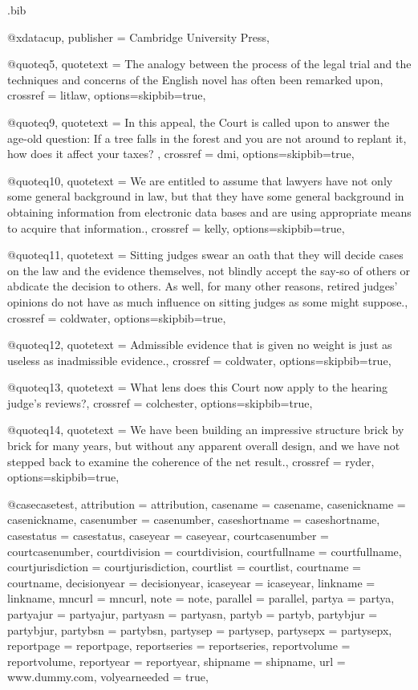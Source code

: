 \begin{filecontents*}[overwrite]{\jobname.bib}


@xdata{cup,	publisher =  {Cambridge University Press},												}

@quote{q5,	quotetext =  {The analogy between the process of the legal trial and the techniques and concerns of the English novel has often been remarked upon},	crossref =  {litlaw},				options={skipbib=true},}

@quote{q9,	quotetext =  { In this appeal, the Court is called upon to answer the age-old question:  If a tree falls in the forest and you are not around to replant it, how does it affect your taxes? },	crossref =  {dmi},				options={skipbib=true},}

@quote{q10,	quotetext =  {We are entitled to assume that lawyers have not only some general background in law, but that they have some general background in obtaining information from electronic data bases and are using appropriate means to acquire that information.},	crossref =  {kelly},				options={skipbib=true},}

@quote{q11,	quotetext =  {Sitting judges swear an oath that they will decide cases on the law and the evidence themselves, not blindly accept the say-so of others or abdicate the decision to others. As well, for many other reasons, retired judges’ opinions do not have as much influence on sitting judges as some might suppose.},	crossref =  {coldwater},				options={skipbib=true},}

@quote{q12,	quotetext =  {Admissible evidence that is given no weight is just as useless as inadmissible evidence.},	crossref =  {coldwater},				options={skipbib=true},}

@quote{q13,	quotetext =  {What lens does this Court now apply to the hearing judge’s reviews?},	crossref =  {colchester},				options={skipbib=true},}

@quote{q14,	quotetext =  {We have been building an impressive structure brick by brick for many years, but without any apparent overall design, and we have not stepped back to examine the coherence of the net result.},	crossref =  {ryder},				options={skipbib=true},}


@case{casetest,
attribution = {attribution},
casename = {casename},
casenickname = {casenickname},
casenumber = {casenumber},
caseshortname = {caseshortname},
casestatus = {casestatus},
caseyear = {caseyear},
courtcasenumber = {courtcasenumber},
courtdivision = {courtdivision},
courtfullname = {courtfullname},
courtjurisdiction = {courtjurisdiction},
courtlist = {courtlist},
courtname = {courtname},
decisionyear = {decisionyear},
icaseyear = {icaseyear},
linkname = {linkname},
mncurl = {mncurl},
note = {note},
parallel = {parallel},
partya = {partya},
partyajur = {partyajur},
partyasn = {partyasn},
partyb = {partyb},
partybjur = {partybjur},
partybsn = {partybsn},
partysep = {partysep},
partysepx = {partysepx},
reportpage = {reportpage},
reportseries = {reportseries},
reportvolume = {reportvolume},
reportyear = {reportyear},
shipname = {shipname},
url = {www.dummy.com},
volyearneeded = {true},
}


\end{filecontents*}
